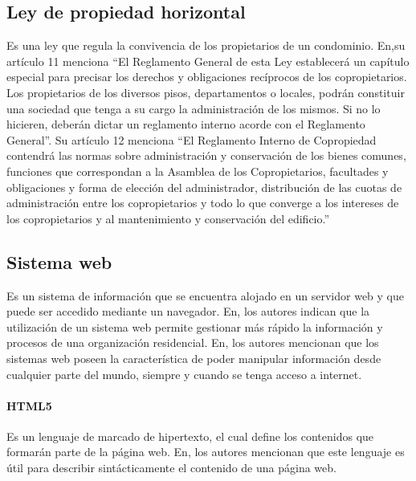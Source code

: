 \subsection{Ley de propiedad horizontal}\label{subsec:ley-de-propiedad-horizontal}
Es una ley que regula la convivencia de los propietarios de un condominio. En\cite{Propiedad_Horizontal},su artículo 11 menciona {\textquotedblleft}El Reglamento General de esta Ley establecerá un capítulo especial para precisar
los derechos y obligaciones recíprocos de los copropietarios. Los propietarios de los
diversos pisos, departamentos o locales, podrán constituir una sociedad que tenga a su
cargo la administración de los mismos. Si no lo hicieren, deberán dictar un reglamento
interno acorde con el Reglamento General{\textquotedblright}. Su artículo 12 menciona {\textquotedblleft}El Reglamento Interno de Copropiedad contendrá las normas sobre administración
y conservación de los bienes comunes, funciones que correspondan a la Asamblea de los
Copropietarios, facultades y obligaciones y forma de elección del administrador,
distribución de las cuotas de administración entre los copropietarios y todo lo que converge
a los intereses de los copropietarios y al mantenimiento y conservación del edificio.{\textquotedblright}

\subsection{Sistema web}\label{subsec:sistema-web}
Es un sistema de información que se encuentra alojado en un servidor web y que puede ser accedido mediante un navegador. En\cite{moreiraDESARROLLOSISTEMAWEB2019, ortegaAnalisisDisenoImplementacion2017, lopezPROTOTIPOSOFTWAREWEB2020, leonardoMejoraControlAsistencia2019}, los autores indican que la utilización de un sistema web permite gestionar más rápido la información y procesos de una organización residencial.
En\cite{lopezPROTOTIPOSOFTWAREWEB2020, bravoSISTEMAINFORMACIONWEB2015, montalvoDesarrolloSistemaSoftware2023, castroReconocimientoFacialGeolocalizacion2023}, los autores mencionan que los sistemas web poseen la característica de poder manipular información desde cualquier parte del mundo, siempre y cuando se tenga acceso a internet.

\paragraph{HTML5}
Es un lenguaje de marcado de hipertexto, el cual define los contenidos que formarán parte de la página web. En\cite{izaDesarrolloERPPara2023}, los autores mencionan que este lenguaje es útil para describir sintácticamente el contenido de una página web.

